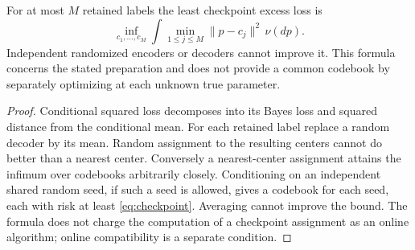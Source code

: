 \begin{proposition}\label{prop:checkpoint}
For at most $M$ retained labels the least checkpoint excess loss is
\begin{equation}\label{eq:checkpoint}
 \inf_{c_1,\ldots,c_M}\int\min_{1\le j\le M}\|p-c_j\|^2\,\nu(dp).
\end{equation}
Independent randomized encoders or decoders cannot improve it. This
formula concerns the stated preparation and does not provide a common
codebook by separately optimizing at each unknown true parameter.
\end{proposition}
\begin{proof}
Conditional squared loss decomposes into its Bayes loss and squared
distance from the conditional mean. For each retained label replace a
random decoder by its mean. Random assignment to the resulting centers
cannot do better than a nearest center. Conversely a nearest-center
assignment attains the infimum over codebooks arbitrarily closely.
Conditioning on an independent shared random seed, if such a seed is
allowed, gives a codebook for each seed, each with risk at least
\eqref{eq:checkpoint}. Averaging cannot improve the bound. The formula
does not charge the computation of a checkpoint assignment as an online
algorithm; online compatibility is a separate condition.
\end{proof}

